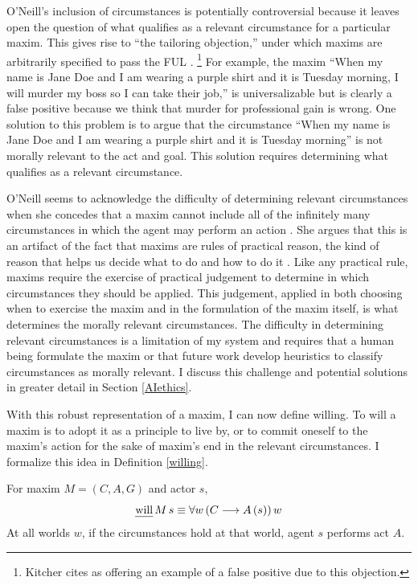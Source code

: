 \begin{isabellebody}
\begin{isamarkuptext}
O'Neill's inclusion of circumstances is potentially controversial because it leaves open the question of what qualifies as a 
relevant circumstance for a particular maxim. This gives rise to ``the tailoring objection,'' 
under which maxims are arbitrarily specified to pass the FUL  \citep[217]{whatisamaxim}. \footnote{Kitcher
cites \citet{kantsethicalthought} as offering an example of a false positive due to this objection.} For example, the maxim ``When my name is Jane Doe
and I am wearing a purple shirt and it is Tuesday morning, I will murder my boss so I can take their job,'' 
is universalizable but is clearly a false positive because we think that murder for professional gain is wrong. 
One solution to this problem is to argue that the circumstance ``When my name is Jane Doe and I am wearing a 
purple shirt and it is Tuesday morning'' is not morally relevant 
to the act and goal. This solution requires determining what qualifies as a relevant circumstance.

O'Neill seems to acknowledge the difficulty of determining relevant circumstances when she concedes that a maxim cannot include all 
of the infinitely many circumstances in which the agent may perform an action \citep[4:428]{actingonprinciple}. She argues that this is 
an artifact of the fact that maxims are rules of practical reason, the kind of reason that helps us decide what to do 
and how to do it \citep{bok}. Like any practical rule, 
maxims require the exercise of practical judgement to determine in which circumstances they should be applied. 
This judgement, applied in both choosing when to exercise the maxim and in the formulation of the maxim 
itself, is what determines the morally relevant circumstances.  
The difficulty in determining relevant circumstances is a limitation of my system and requires that a 
human being formulate the maxim or that future work develop heuristics to classify circumstances as morally 
relevant. I discuss this challenge and potential solutions in greater detail in Section \ref{AIethics}.

With this robust representation of a maxim, I can now define willing. To will a maxim is to adopt it 
as a principle to live by, or to commit oneself to the maxim's action for the 
sake of maxim's end in the relevant circumstances. I formalize this idea in Definition \ref{willing}.

\begin{definition}[Willing]\label{willing}
For maxim $M = (C, A, G)$ and actor $s$,
$$\text{\emph{will}} \, M \, s \equiv \forall w \, (C \longrightarrow A \, (s)) \, w$$
\noindent At all worlds $w$, if the circumstances hold at that world, agent $s$ performs act $A$.
\end{definition}


\end{isamarkuptext}
\end{isabellebody}
